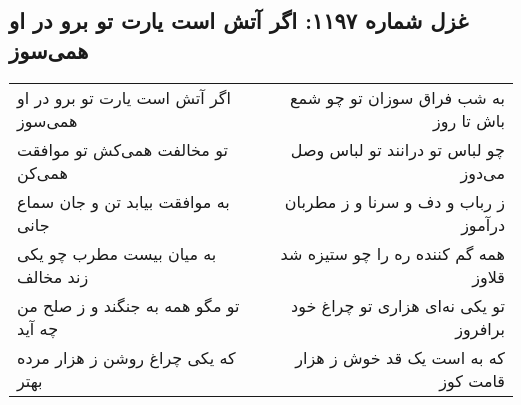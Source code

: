 \begin{center}
\section*{غزل شماره ۱۱۹۷: اگر آتش است یارت تو برو در او همی‌سوز}
\label{sec:1197}
\begin{longtable}{l p{0.5cm} r}
اگر آتش است یارت تو برو در او همی‌سوز
&&
به شب فراق سوزان تو چو شمع باش تا روز
\\
تو مخالفت همی‌کش تو موافقت همی‌کن
&&
چو لباس تو درانند تو لباس وصل می‌دوز
\\
به موافقت بیابد تن و جان سماع جانی
&&
ز رباب و دف و سرنا و ز مطربان درآموز
\\
به میان بیست مطرب چو یکی زند مخالف
&&
همه گم کننده ره را چو ستیزه شد قلاوز
\\
تو مگو همه به جنگند و ز صلح من چه آید
&&
تو یکی نه‌ای هزاری تو چراغ خود برافروز
\\
که یکی چراغ روشن ز هزار مرده بهتر
&&
که به است یک قد خوش ز هزار قامت کوز
\\
\end{longtable}
\end{center}

